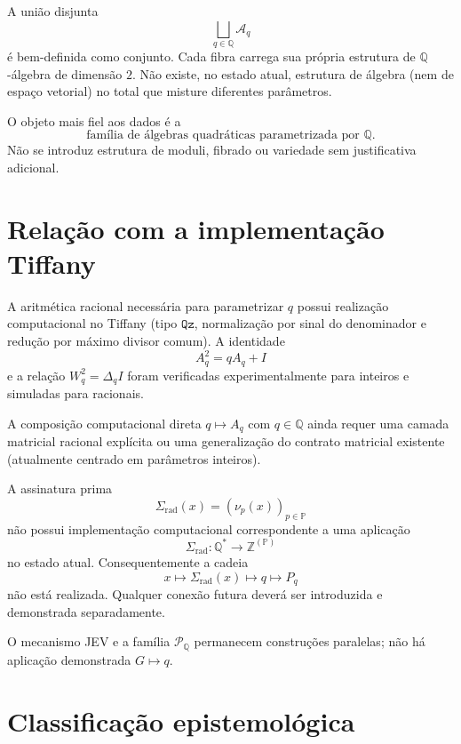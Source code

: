 \documentclass[11pt,a4paper]{article}
\begin{document}
A união disjunta
\[
\bigsqcup_{q\in\mathbb{Q}}\mathcal{A}_q
\]
é bem-definida como conjunto. Cada fibra carrega sua própria estrutura de
\(\mathbb{Q}\)-álgebra de dimensão \(2\). Não existe, no estado atual,
estrutura de álgebra (nem de espaço vetorial) no total que misture
diferentes parâmetros.

O objeto mais fiel aos dados é a
\[
\boxed{
\text{família de álgebras quadráticas parametrizada por }\mathbb{Q}.
}
\]
Não se introduz estrutura de moduli, fibrado ou variedade sem justificativa
adicional.

\section{Relação com a implementação Tiffany}

A aritmética racional necessária para parametrizar \(q\) possui realização
computacional no Tiffany (tipo \(\mathtt{Qz}\), normalização por sinal do
denominador e redução por máximo divisor comum). A identidade
\[
A_q^2=qA_q+I
\]
e a relação \(W_q^2=\Delta_q I\) foram verificadas experimentalmente para
inteiros e simuladas para racionais.

A composição computacional direta \(q\mapsto A_q\) com \(q\in\mathbb{Q}\)
ainda requer uma camada matricial racional explícita ou uma generalização
do contrato matricial existente (atualmente centrado em parâmetros inteiros).

A assinatura prima
\[
\Sigma_{\mathrm{rad}}(x)=(\nu_p(x))_{p\in\mathbb{P}}
\]
não possui implementação computacional correspondente a uma aplicação
\[
\Sigma_{\mathrm{rad}}:\mathbb{Q}^*\to\mathbb{Z}^{(\mathbb{P})}
\]
no estado atual. Consequentemente a cadeia
\[
x\longmapsto\Sigma_{\mathrm{rad}}(x)\longmapsto q\longmapsto P_q
\]
não está realizada. Qualquer conexão futura deverá ser introduzida e
demonstrada separadamente.

O mecanismo JEV e a família \(\mathcal{P}_{\mathbb{Q}}\) permanecem
construções paralelas; não há aplicação demonstrada \(G\mapsto q\).

\section{Classificação epistemológica}
\end{document}
